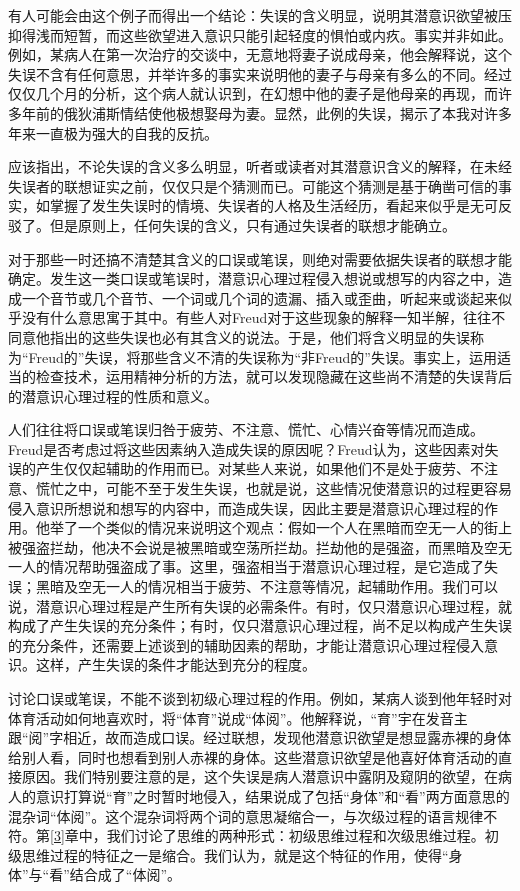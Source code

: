 \documentclass[UTF8,10pt,a4paper,openany]{book}
\begin{document}
有人可能会由这个例子而得出一个结论：失误的含义明显，说明其潜意识欲望被压抑得浅而短暂，而这些欲望进入意识只能引起轻度的惧怕或内疚。事实并非如此。例如，某病人在第一次治疗的交谈中，无意地将妻子说成母亲，他会解释说，这个失误不含有任何意思，并举许多的事实来说明他的妻子与母亲有多么的不同。经过仅仅几个月的分析，这个病人就认识到，在幻想中他的妻子是他母亲的再现，而许多年前的俄狄浦斯情结使他极想娶母为妻。显然，此例的失误，揭示了本我对许多年来一直极为强大的自我的反抗。

应该指出，不论失误的含义多么明显，听者或读者对其潜意识含义的解释，在未经失误者的联想证实之前，仅仅只是个猜测而已。可能这个猜测是基于确凿可信的事实，如掌握了发生失误时的情境、失误者的人格及生活经历，看起来似乎是无可反驳了。但是原则上，任何失误的含义，只有通过失误者的联想才能确立。

对于那些一时还搞不清楚其含义的口误或笔误，则绝对需要依据失误者的联想才能确定。发生这一类口误或笔误时，潜意识心理过程侵入想说或想写的内容之中，造成一个音节或几个音节、一个词或几个词的遗漏、插入或歪曲，听起来或谈起来似乎没有什么意思寓于其中。有些人对Freud对于这些现象的解释一知半解，往往不同意他指出的这些失误也必有其含义的说法。于是，他们将含义明显的失误称为“Freud的”失误，将那些含义不清的失误称为“非Freud的”失误。事实上，运用适当的检查技术，运用精神分析的方法，就可以发现隐藏在这些尚不清楚的失误背后的潜意识心理过程的性质和意义。

人们往往将口误或笔误归咎于疲劳、不注意、慌忙、心情兴奋等情况而造成。Freud是否考虑过将这些因素纳入造成失误的原因呢？Freud认为，这些因素对失误的产生仅仅起辅助的作用而已。对某些人来说，如果他们不是处于疲劳、不注意、慌忙之中，可能不至于发生失误，也就是说，这些情况使潜意识的过程更容易侵入意识所想说和想写的内容中，而造成失误，因此主要是潜意识心理过程的作用。他举了一个类似的情况来说明这个观点：假如一个人在黑暗而空无一人的街上被强盗拦劫，他决不会说是被黑暗或空荡所拦劫。拦劫他的是强盗，而黑暗及空无一人的情况帮助强盗成了事。这里，强盗相当于潜意识心理过程，是它造成了失误；黑暗及空无一人的情况相当于疲劳、不注意等情况，起辅助作用。我们可以说，潜意识心理过程是产生所有失误的必需条件。有时，仅只潜意识心理过程，就构成了产生失误的充分条件；有时，仅只潜意识心理过程，尚不足以构成产生失误的充分条件，还需要上述谈到的辅助因素的帮助，才能让潜意识心理过程侵入意识。这样，产生失误的条件才能达到充分的程度。

讨论口误或笔误，不能不谈到初级心理过程的作用。例如，某病人谈到他年轻时对体育活动如何地喜欢时，将“体育”说成“体阅”。他解释说，“育”宇在发音主跟“阅”字相近，故而造成口误。经过联想，发现他潜意识欲望是想显露赤裸的身体给别人看，同时也想看到别人赤裸的身体。这些潜意识欲望是他喜好体育活动的直接原因。我们特别要注意的是，这个失误是病人潜意识中露阴及窥阴的欲望，在病人的意识打算说“育”之时暂时地侵入，结果说成了包括“身体”和“看”两方面意思的混杂词“体阅”。这个混杂词将两个词的意思凝缩合一，与次级过程的语言规律不符。第\ref{3}章中，我们讨论了思维的两种形式：初级思维过程和次级思维过程。初级思维过程的特征之一是缩合。我们认为，就是这个特征的作用，使得“身体”与“看”结合成了“体阅”。
\end{document}
